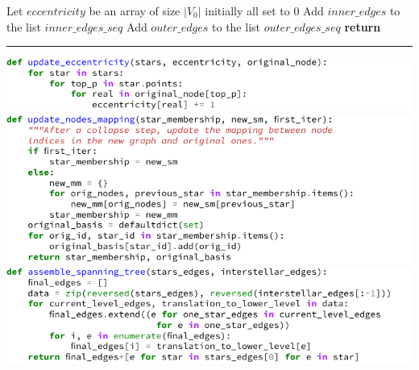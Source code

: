 \begin{algorithm}[tbh]
  \caption{\gtx{}($G_0=(V_0,E_0)$) \label{alg:gtx}}
	\begin{algorithmic}[1]
    \State Let $eccentricity$ be an array of size $|V_0|$ initially all set to $0$
    \Repeat
      \State Add $inner\_edges$ to the list $inner\_edges\_seq$
      \State {}
      \State Add $outer\_edges$ to the list $outer\_edges\_seq$
    \State \textbf{return} 
		\begin{center}
      \vspace{-.5\baselineskip}
			\rule{0.5\textwidth}{.2pt}
		\end{center}
    \includegraphics{assets/tmp-code/update_eccentricity.pdf}
    \includegraphics{assets/tmp-code/update_nodes_mapping.pdf}
    \includegraphics{assets/tmp-code/assemble_spanning_tree.pdf}
	\end{algorithmic}
\end{algorithm}


